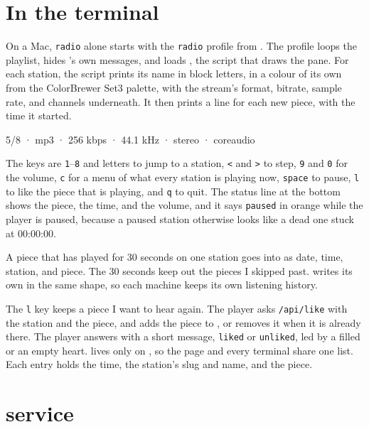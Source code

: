 \documentclass[11pt,a4paper]{article}
\begin{document}
\section*{In the terminal}

On a Mac, \texttt{radio} alone starts  with the \texttt{radio} profile from . The profile loops the playlist, hides 's own messages, and loads , the script that draws the pane. For each station, the script prints its name in block letters, in a colour of its own from the ColorBrewer Set3 palette, with the stream's format, bitrate, sample rate, and channels underneath. It then prints a line for each new piece, with the time it started.

\begin{cmdout}
5/8  ·  mp3  ·  256 kbps  ·  44.1 kHz  ·  stereo  ·  coreaudio
\end{cmdout}

The keys are \texttt{1}--\texttt{8} and letters to jump to a station, \texttt{<} and \texttt{>} to step, \texttt{9} and \texttt{0} for the volume, \texttt{c} for a menu of what every station is playing now, \texttt{space} to pause, \texttt{l} to like the piece that is playing, and \texttt{q} to quit. The status line at the bottom shows the piece, the time, and the volume, and it says \texttt{paused} in orange while the player is paused, because a paused station otherwise looks like a dead one stuck at 00:00:00.

A piece that has played for 30 seconds on one station goes into  as date, time, station, and piece. The 30 seconds keep out the pieces I skipped past.  writes its own  in the same shape, so each machine keeps its own listening history.

The \texttt{l} key keeps a piece I want to hear again. The player asks  \texttt{/api/like} with the station and the piece, and  adds the piece to , or removes it when it is already there. The player answers with a short message, \texttt{liked} or \texttt{unliked}, led by a filled or an empty heart.  lives only on , so the page and every terminal share one list. Each entry holds the time, the station's slug and name, and the piece.

\section*{ service}
\end{document}
